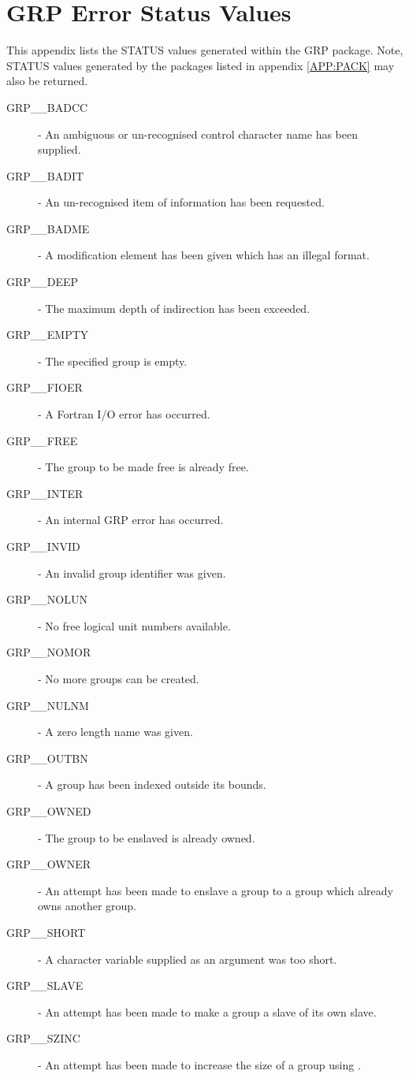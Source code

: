 \normalsize


\section{\label{APP:ERRORS}GRP Error Status Values}
This appendix lists the STATUS values generated within the GRP package. Note,
STATUS values generated by the packages listed in appendix \ref{APP:PACK} may
also be returned.

\begin{description}
\item [GRP\_\_BADCC] - An ambiguous or un-recognised control character name has
been supplied.
\item [GRP\_\_BADIT] - An un-recognised item of information has been requested.
\item [GRP\_\_BADME] - A modification element has been given which has an
illegal format.
\item [GRP\_\_DEEP] - The maximum depth of indirection has been exceeded.
\item [GRP\_\_EMPTY] - The specified group is empty.
\item [GRP\_\_FIOER] - A Fortran I/O error has occurred.
\item [GRP\_\_FREE] - The group to be made free is already free.
\item [GRP\_\_INTER] - An internal GRP error has occurred.
\item [GRP\_\_INVID] - An invalid group identifier was given.
\item [GRP\_\_NOLUN] - No free logical unit numbers available.
\item [GRP\_\_NOMOR] - No more groups can be created.
\item [GRP\_\_NULNM] - A zero length name was given.
\item [GRP\_\_OUTBN] - A group has been indexed outside its bounds.
\item [GRP\_\_OWNED] - The group to be enslaved is already owned.
\item [GRP\_\_OWNER] - An attempt has been made to enslave a group to a group
which already owns another group.
\item [GRP\_\_SHORT] - A character variable supplied as an argument was too
short.
\item [GRP\_\_SLAVE] - An attempt has been made to make a group a slave of its
own slave.
\item [GRP\_\_SZINC] - An attempt has been made to increase the size of a
group using .
\end{description}

